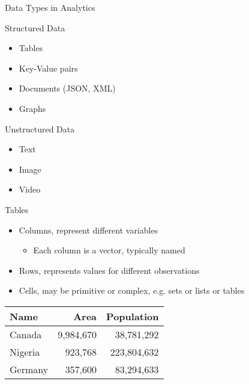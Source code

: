 \documentclass[ignorenonframetext,xcolor=x11names]{beamer}
\begin{document}
\begin{frame}{Data Types in Analytics}
\begin{block}{Structured Data}
\begin{itemize}
	\item Tables
	\item Key-Value pairs
	\item Documents (JSON, XML)
	\item Graphs
\end{itemize}
\end{block}
\begin{block}{Unstructured Data}
\begin{itemize}
	\item Text
	\item Image
	\item Video
\end{itemize}
\end{block}
\end{frame}

\begin{frame}{Tables}
\begin{itemize}
	\item Columns, represent different variables
		\begin{itemize}
			\item Each column is a vector, typically named
		\end{itemize}
	\item Rows, represents values for different observations
	\item Cells, may be primitive or complex, e.g. sets or lists or tables
\end{itemize}
\centering
\vspace{5mm}
\renewcommand{\arraystretch}{1.25}

\begin{tabular}{l|r|r} \hline
\textbf{Name} & \textbf{Area} & \textbf{Population} \\ \hline
Canada & 9,984,670 & 38,781,292  \\
Nigeria & 923,768 & 223,804,632 \\
Germany & 357,600 & 83,294,633 \\ \hline
\end{tabular}
\end{frame}
\end{document}
